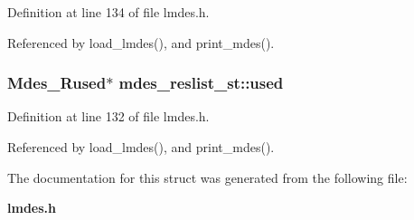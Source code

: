 Definition at line 134 of file lmdes.h.

Referenced by load\_\-lmdes(), and print\_\-mdes().
\subsubsection{\setlength{\rightskip}{0pt plus 5cm}\bf{Mdes\_\-Rused}$\ast$ \bf{mdes\_\-reslist\_\-st::used}}\label{structmdes__reslist__st_cb66cfe3b8b5e935c283068e0c3471db}




Definition at line 132 of file lmdes.h.

Referenced by load\_\-lmdes(), and print\_\-mdes().

The documentation for this struct was generated from the following file:\begin{CompactItemize}
\item 
\bf{lmdes.h}\end{CompactItemize}
